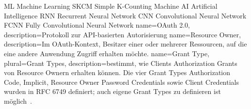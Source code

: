 


 {ML} {Machine Learning}
 {SKCM} {Simple K-Counting Machine}
 {AI} {Artificial Intelligence}
 {RNN} {Recurrent Neural Network}
 {CNN} {Convolutional Neural Network}
 {FCNN} {Fully Convolutional Neural Network}
 {
    name={OAuth 2.0},
    description={Protokoll zur API-basierten Autorisierung}
}
 {
    name={Resource Owner},
    description={Im \gls{OAuth}-Kontext, Besitzer einer oder mehrerer
    Ressourcen, auf die eine andere Anwendung Zugriff erhalten möchte.}
}
 {
    name={Grant Type},
    plural={Grant Types},
    description={bestimmt, wie Clients Authorization Grants von Resource Ownern
    erhalten können. Die vier Grant Types\: Authorization Code, Implicit, Resource Owner Password Credentials sowie Client Credentials wurden in RFC 6749
    definiert; auch eigene Grant Types zu definieren ist möglich~.}
}
